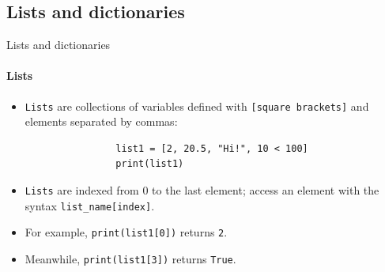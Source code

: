 \documentclass[notes,11pt, aspectratio=169, xcolor=table]{beamer}
\begin{document}
\subsection{Lists and dictionaries}  

    \begin{frame}[fragile=singleslide]{Lists and dictionaries}
    \framesubtitle{Lists}
    
         \begin{itemize}
            \item \texttt{Lists} are collections of variables defined with \texttt{[square brackets]} and elements separated by commas:

                \begin{verbatim}
                list1 = [2, 20.5, "Hi!", 10 < 100] 
                print(list1)
                \end{verbatim}    

            \item \texttt{Lists} are indexed from $0$ to the last element; access an element with the syntax \texttt{list_name[index]}.
            
            \item For example, \texttt{print(list1[0])} returns \texttt{2}.
            
            \item Meanwhile, \texttt{print(list1[3])} returns \texttt{True}.

        \end{itemize}       

    \end{frame}
\end{document}
